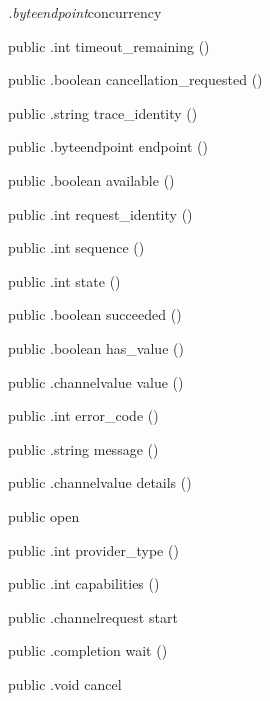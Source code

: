 \begin{CrexxClass}{\textit{.byteendpoint}}{concurrency}
\begin{Members}
    \Method
      {public}
      {.int}
      {timeout\_remaining}
      {()}

    \Method
      {public}
      {.boolean}
      {cancellation\_requested}
      {()}

    \Method
      {public}
      {.string}
      {trace\_identity}
      {()}

    \Method
      {public}
      {.byteendpoint}
      {endpoint}
      {()}

    \Method
      {public}
      {.boolean}
      {available}
      {()}

    \Method
      {public}
      {.int}
      {request\_identity}
      {()}

    \Method
      {public}
      {.int}
      {sequence}
      {()}

    \Method
      {public}
      {.int}
      {state}
      {()}

    \Method
      {public}
      {.boolean}
      {succeeded}
      {()}

    \Method
      {public}
      {.boolean}
      {has\_value}
      {()}

    \Method
      {public}
      {.channelvalue}
      {value}
      {()}

    \Method
      {public}
      {.int}
      {error\_code}
      {()}

    \Method
      {public}
      {.string}
      {message}
      {()}

    \Method
      {public}
      {.channelvalue}
      {details}
      {()}

    \Factory
      {public}
      {open}
      {}

    \Method
      {public}
      {.int}
      {provider\_type}
      {()}

    \Method
      {public}
      {.int}
      {capabilities}
      {()}

    \Method
      {public}
      {.channelrequest}
      {start}
      {}

    \Method
      {public}
      {.completion}
      {wait}
      {()}

    \Method
      {public}
      {.void}
      {cancel}
      {}


\end{Members}
\end{CrexxClass}
